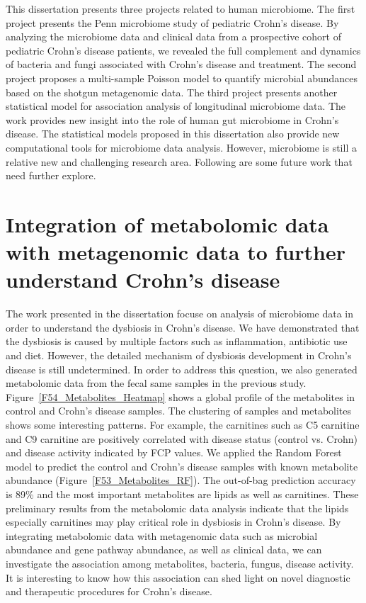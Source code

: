 \label{chpt:discussion}

This dissertation presents three projects related to human microbiome. The first project presents the Penn microbiome study of pediatric Crohn’s disease. By analyzing the microbiome data and clinical data from a prospective cohort of pediatric Crohn’s disease patients, we revealed the full complement and dynamics of bacteria and fungi associated with Crohn’s disease and treatment. The second project proposes a multi-sample Poisson model to quantify microbial abundances based on the shotgun metagenomic data. The third project presents another statistical model for association analysis of longitudinal microbiome data. The work provides new insight into the role of human gut microbiome in Crohn’s disease. The statistical models proposed in this dissertation also provide new computational tools for microbiome data analysis. However, microbiome is still a relative new and challenging research area. Following are some future work that need further explore.

\section{Integration of metabolomic data with metagenomic data to further understand Crohn's disease}
The work presented in the dissertation focuse on analysis of microbiome data in order to understand the dysbiosis in Crohn's disease. We have demonstrated that the dysbiosis is caused by multiple factors such as inflammation, antibiotic use and diet. However, the detailed mechanism of dysbiosis development in Crohn's disease is still undetermined. In order to address this question, we also generated metabolomic data from the fecal same samples in the previous study. 
Figure~\ref{F54_Metabolites_Heatmap} shows a global profile of the metabolites in control and Crohn's disease samples.  The clustering of samples and metabolites shows some interesting patterns. For example, the carnitines such as C5 carnitine and C9 carnitine are positively correlated with disease status (control vs. Crohn) and disease activity indicated by FCP values.  We applied the Random Forest model to predict the control and Crohn's disease samples with known metabolite abundance (Figure~\ref{F53_Metabolites_RF}). The out-of-bag prediction accuracy is 89\% and the most important metabolites are lipids as well as carnitines. These preliminary results from the metabolomic data analysis indicate that the lipids especially carnitines may play critical role in dysbiosis in Crohn's disease. By integrating metabolomic data with metagenomic data such as microbial abundance and gene pathway abundance, as well as clinical data, we can investigate the association among metabolites, bacteria, fungus, disease activity. It is interesting to know how this association can shed light on novel diagnostic and therapeutic procedures for Crohn's disease. 


